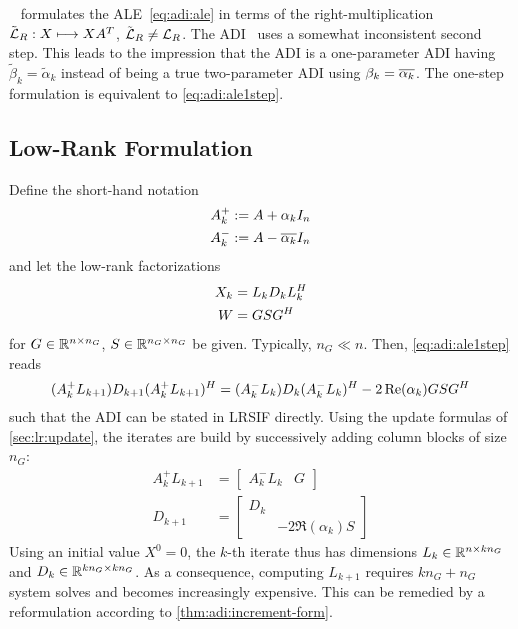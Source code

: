 \begin{remark}
  \citeauthor{Lang2017}~\cite{Lang2017} formulates the \ac{ALE}~\eqref{eq:adi:ale} in terms of the
  right-multiplication $\tilde {\operatorname{\mathcal L}}_R :X \longmapsto XA^T$, $\tilde {\operatorname{\mathcal L}}_R \neq \operatorname{\mathcal L}_R$.
  The ADI~\cite[Equation~(2.23)]{Lang2017} uses a somewhat inconsistent second step.
  This leads to the impression that the ADI is a one-parameter ADI having $\tilde\beta_k = \tilde\alpha_k$
  instead of being a true two-parameter ADI using $\beta_k = \conj{\alpha_k}$.
  The one-step formulation \cite[Equation~(2.24)]{Lang2017} is equivalent to \eqref{eq:adi:ale1step}.
\end{remark}

\subsection{Low-Rank Formulation}
\label{sec:adi:lr1step}

Define the short-hand notation
\begin{equation}
\label{eq:adi:ale:shorthand}
\begin{aligned}
  A^+_k &:= A + \alpha_k I_n \\
  A^-_k &:= A - \conj{\alpha_k} I_n
\end{aligned}
\end{equation}
and let the low-rank factorizations
\begin{equation}
\begin{aligned}
  X_k &= L_k D_k L_k^H \\
  W &= GSG^H
\end{aligned}
\end{equation}
for $G\in\mathbb{R}^{n\times n_G}$, $S\in\mathbb{R}^{n_G\times n_G}$ be given.
Typically, $n_G \ll n$.
Then, \eqref{eq:adi:ale1step} reads
\begin{equation}
  (A_k^+ L_{k+1}) D_{k+1} (A_k^+ L_{k+1})^H
  = (A_k^- L_k) D_k (A_k^- L_k)^H - 2\operatorname{Re}(\alpha_k) GSG^H
\end{equation}
such that
the \ac{ADI} can be stated in \ac{LRSIF} directly.
Using the update formulas of \autoref{sec:lr:update},
the iterates are build by successively adding column blocks of size $n_G$:
\begin{equation}
\begin{aligned}
  A_k^+ L_{k+1} &= \begin{bmatrix}
    A^-_k L_k &
    G
  \end{bmatrix} \\
  D_{k+1} &= \begin{bmatrix}
    D_k \\
    & -2\Re(\alpha_k) S
  \end{bmatrix}
\end{aligned}
\end{equation}
Using an initial value $X^0=0$,
the $k$-th iterate thus has dimensions $L_k \in\mathbb{R}^{n\times kn_G}$ and $D_k \in\mathbb{R}^{kn_G\times kn_G}$.
As a consequence, computing $L_{k+1}$
requires $kn_G + n_G$ system solves and
becomes increasingly expensive.
This can be remedied by a reformulation according to \autoref{thm:adi:increment-form}.

